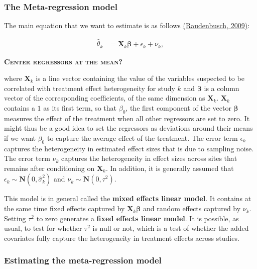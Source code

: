 \documentclass[]{book}
\theoremstyle{definition}
\theoremstyle{definition}
\theoremstyle{definition}
\theoremstyle{remark}
\begin{document}
\subsubsection{The Meta-regression
model}\label{the-meta-regression-model}

The main equation that we want to estimate is as follows
\href{https://www.jstor.org/stable/10.7758/9781610441384}{(Raudenbusch,
2009)}:

\begin{align}
  \hat{\theta}_k & = \mathbf{X}_k \mathbf{\beta}  + \epsilon_k + \nu_k,
\end{align}

\textbf{\textsc{Center regressors at the mean?}}

where \(\mathbf{X}_k\) is a line vector containing the value of the
variables suspected to be correlated with treatment effect heterogeneity
for study \(k\) and \(\mathbf{\beta}\) is a column vector of the
corresponding coefficients, of the same dimension as \(\mathbf{X}_k\).
\(\mathbf{X}_k\) contains a \(1\) as its first term, so that
\(\beta_0\), the first component of the vector \(\mathbf{\beta}\)
measures the effect of the treatment when all other regressors are set
to zero. It might thus be a good idea to set the regressors as
deviations around their means if we want \(\beta_0\) to capture the
average effect of the treatment. The error term \(\epsilon_k\) captures
the heterogeneity in estimated effect sizes that is due to sampling
noise. The error term \(\nu_k\) captures the heterogeneity in effect
sizes across sites that remains after conditioning on \(\mathbf{X}_k\).
In addition, it is generally assumed that
\(\epsilon_k\sim\mathbf{N}(0,\hat{\sigma}^2_k)\) and
\(\nu_k\sim\mathbf{N}(0,\tau^2)\).

This model is in general called the \textbf{mixed effects linear model}.
It contains at the same time fixed effects captured by
\(\mathbf{X}_k \mathbf{\beta}\) and random effects captured by
\(\nu_k\). Setting \(\tau^2\) to zero generates a \textbf{fixed effects
linear model}. It is possible, as usual, to test for whether \(\tau^2\)
is null or not, which is a test of whether the added covariates fully
capture the heterogeneity in treatment effects across studies.

\subsubsection{Estimating the meta-regression
model}\label{estimating-the-meta-regression-model}
\end{document}

